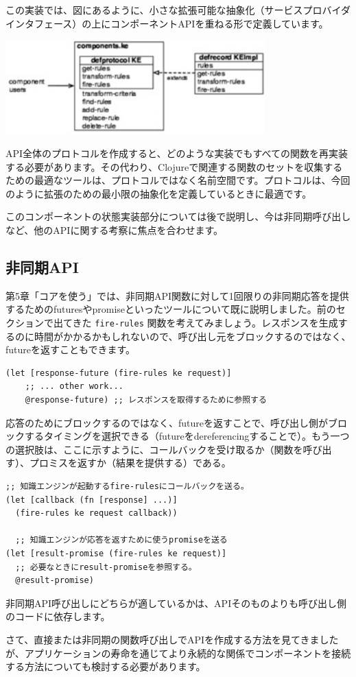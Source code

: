 この実装では、図にあるように、小さな拡張可能な抽象化（サービスプロバイダインタフェース）の上にコンポーネントAPIを重ねる形で定義しています。

\includegraphics[width=10cm]{fig_06_002.eps}

API全体のプロトコルを作成すると、どのような実装でもすべての関数を再実装する必要があります。その代わり、Clojureで関連する関数のセットを収集するための最適なツールは、プロトコルではなく名前空間です。プロトコルは、今回のように拡張のための最小限の抽象化を定義しているときに最適です。

このコンポーネントの状態実装部分については後で説明し、今は非同期呼び出しなど、他のAPIに関する考察に焦点を合わせます。


\subsection{非同期API}

第5章「コアを使う」では、非同期API関数に対して1回限りの非同期応答を提供するためのfuturesやpromiseといったツールについて既に説明しました。前のセクションで出てきた \texttt{fire-rules} 関数を考えてみましょう。レスポンスを生成するのに時間がかかるかもしれないので、呼び出し元をブロックするのではなく、futureを返すこともできます。

\begin{lstlisting}[numbers=none]
  (let [response-future (fire-rules ke request)]
    ;; ... other work...
    @response-future) ;; レスポンスを取得するために参照する
\end{lstlisting}

応答のためにブロックするのではなく、futureを返すことで、呼び出し側がブロックするタイミングを選択できる（futureをdereferencingすることで）。もう一つの選択肢は、ここに示すように、コールバックを受け取るか（関数を呼び出す）、プロミスを返すか（結果を提供する）である。


\begin{lstlisting}[numbers=none]
;; 知識エンジンが起動するfire-rulesにコールバックを送る。
(let [callback (fn [response] ...)]
  (fire-rules ke request callback))

  ;; 知識エンジンが応答を返すために使うpromiseを送る
(let [result-promise (fire-rules ke request)]
  ;; 必要なときにresult-promiseを参照する。
  @result-promise)
\end{lstlisting}

非同期API呼び出しにどちらが適しているかは、APIそのものよりも呼び出し側のコードに依存します。

さて、直接または非同期の関数呼び出しでAPIを作成する方法を見てきましたが、アプリケーションの寿命を通じてより永続的な関係でコンポーネントを接続する方法についても検討する必要があります。






